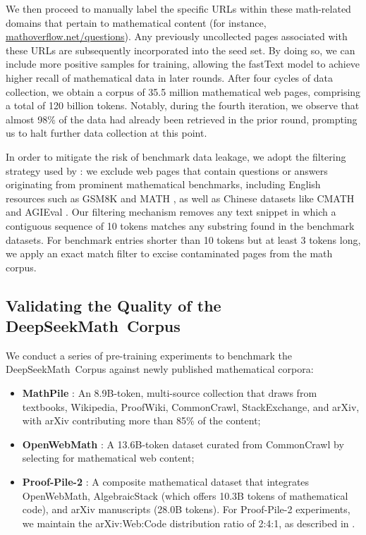 We then proceed to manually label the specific URLs within these math-related domains that pertain to mathematical content (for instance, \url{mathoverflow.net/questions}). Any previously uncollected pages associated with these URLs are subsequently incorporated into the seed set. By doing so, we can include more positive samples for training, allowing the fastText model to achieve higher recall of mathematical data in later rounds. After four cycles of data collection, we obtain a corpus of 35.5 million mathematical web pages, comprising a total of 120 billion tokens. Notably, during the fourth iteration, we observe that almost 98\% of the data had already been retrieved in the prior round, prompting us to halt further data collection at this point.

In order to mitigate the risk of benchmark data leakage, we adopt the filtering strategy used by \cite{deepseek-coder}: we exclude web pages that contain questions or answers originating from prominent mathematical benchmarks, including English resources such as GSM8K \citep{gsm8k} and MATH \citep{MATH}, as well as Chinese datasets like CMATH \citep{wei2023cmath} and AGIEval \citep{agieval}. Our filtering mechanism removes any text snippet in which a contiguous sequence of 10 tokens matches any substring found in the benchmark datasets. For benchmark entries shorter than 10 tokens but at least 3 tokens long, we apply an exact match filter to excise contaminated pages from the math corpus.

\subsection{Validating the Quality of the DeepSeekMath~Corpus}

We conduct a series of pre-training experiments to benchmark the DeepSeekMath~Corpus against newly published mathematical corpora:

\begin{itemize}[topsep=0pt]
    \item \textbf{MathPile} \citep{mathpile}: An 8.9B-token, multi-source collection that draws from textbooks, Wikipedia, ProofWiki, CommonCrawl, StackExchange, and arXiv, with arXiv contributing more than 85\% of the content;
    \item \textbf{OpenWebMath} \citep{openwebmath}: A 13.6B-token dataset curated from CommonCrawl by selecting for mathematical web content;
    \item \textbf{Proof-Pile-2} \citep{llemma}: A composite mathematical dataset that integrates OpenWebMath, AlgebraicStack (which offers 10.3B tokens of mathematical code), and arXiv manuscripts (28.0B tokens). For Proof-Pile-2 experiments, we maintain the arXiv:Web:Code distribution ratio of 2:4:1, as described in \cite{llemma}.
\end{itemize}

